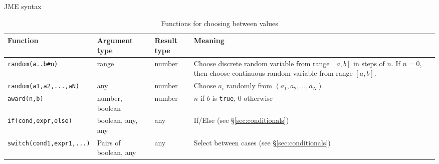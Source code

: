 \begin{chapter}{\label{cha:jme_syntax}JME syntax}
  \begin{sidewaystable}[ht]
  	\centering
    \begin{tabular}{lllp{20em}}
  		\hline
  		Function & Argument type & Result type & Meaning \\
  		\hline
      \verb"random(a..b#n)"	& range & number & Choose discrete random variable
      from range $[a,b]$ in steps of $n$.  If $n=0$, then choose continuous
      random variable from range $[a,b]$.\\
      \verb"random(a1,a2,...,aN)"	& any & number & Choose $a_{i}$ randomly from
      $(a_1, a_2, \ldots, a_N)$ \\
      \verb"award(n,b)"	& number, boolean & number & $n$ if $b$ is \verb"true",
      $0$ otherwise \\
  		\verb"if(cond,expr,else)" & boolean, any, any & any	& If/Else (see
      \S\ref{sec:conditionals}) \\
      \verb"switch(cond1,expr1,...)" & Pairs of boolean, any & any & Select
      between cases (see \S\ref{sec:conditionals})\\
  	\end{tabular}
  	\caption{\label{tab:choicefunctions}
  		Functions for choosing between values
  	}
  \end{sidewaystable}
\end{chapter}
